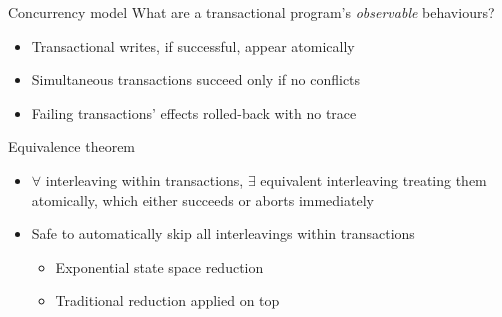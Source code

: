 \documentclass[xcolor=dvipsnames]{beamer}
\begin{document}
\begin{frame}{Concurrency model}
	What are a transactional program's {\em observable} behaviours?
	\begin{itemize}
		\item Transactional writes, if successful, appear atomically %
		\item Simultaneous transactions succeed only if no conflicts
		\item Failing transactions' effects rolled-back with no trace
	\end{itemize}
	\pause
	\linegap

	Equivalence theorem
	\begin{itemize}
		\item $\forall$ interleaving within transactions, $\exists$ equivalent interleaving
			treating them atomically, which either succeeds or aborts immediately
		\item Safe to automatically skip all interleavings within transactions %
			\begin{itemize}
				\item Exponential state space reduction
				\item Traditional reduction %
					applied on top
			\end{itemize}
	\end{itemize}
\end{frame}
\end{document}
